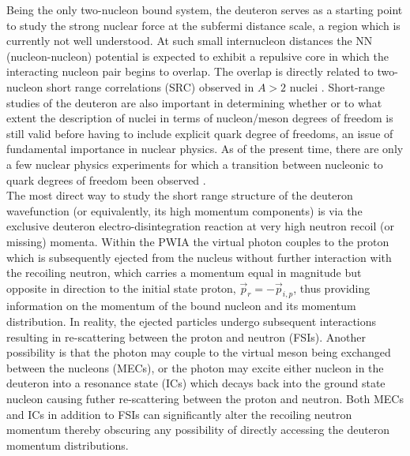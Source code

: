 Being the only two-nucleon bound system, the deuteron serves as a starting point to study the strong nuclear force at the subfermi distance scale, a region which is currently
not well understood. At such small internucleon distances the NN (nucleon-nucleon) potential is expected to exhibit a repulsive core in which the interacting
nucleon pair begins to overlap. The overlap is directly related to two-nucleon short range correlations (SRC) observed in $A>2$ nuclei \cite{PhysRevC.68.014313,PhysRevLett.96.082501,PhysRevLett.99.072501,Fomin_2017}.
Short-range studies of the deuteron are also important in determining whether or to what extent the description of nuclei in terms of nucleon/meson degrees of freedom is still valid before
having to include explicit quark degree of freedoms, an issue of fundamental importance in nuclear physics\cite{pr01-020}. As of the present time, there are only a few nuclear physics experiments for
which a transition between nucleonic to quark degrees of freedom been observed \cite{PhysRevLett.81.4576,PhysRevLett.87.102302,PhysRevC.66.042201}.\\
\indent The most direct way to study the short range structure of the deuteron wavefunction (or equivalently, its high momentum components) is via the exclusive deuteron
electro-disintegration reaction at very high neutron recoil (or missing) momenta. Within the PWIA the virtual photon couples to
the proton which is subsequently ejected from the nucleus without further interaction with the recoiling neutron, which carries a momentum equal in magnitude but opposite in direction
to the initial state proton, $\vec{p}_{r} = -\vec{p}_{i,p}$, thus providing information on the momentum of the bound nucleon and its momentum distribution.
\indent In reality, the ejected particles undergo subsequent interactions resulting in re-scattering between the proton and neutron (FSIs). Another possibility is that the
photon may couple to the virtual meson being exchanged between the nucleons (MECs), or the photon may excite either nucleon in the deuteron into a resonance state (ICs) which
decays back into the ground state nucleon causing futher re-scattering between the proton and neutron. Both MECs and ICs in addition to FSIs can significantly alter the recoiling neutron
momentum thereby obscuring any possibility of directly accessing the deuteron momentum distributions. \\
